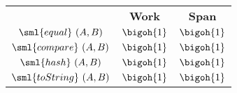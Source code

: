 \begin{costspec}[UnitElt]
\label{cost:unit}
\begin{tabular}{c|c|c}
& \textbf{Work} & \textbf{Span} \\
$\sml{equal}~(A,B)$ & $\bigoh {1}$ & $\bigoh {1}$ \\
$\sml{compare}~(A,B)$ & $\bigoh {1}$ & $\bigoh {1}$ \\
$\sml{hash}~(A,B)$ & $\bigoh {1}$ & $\bigoh {1}$ \\
$\sml{toString}~(A,B)$ & $\bigoh {1}$ & $\bigoh {1}$ \\
\end{tabular}
\end{costspec}
